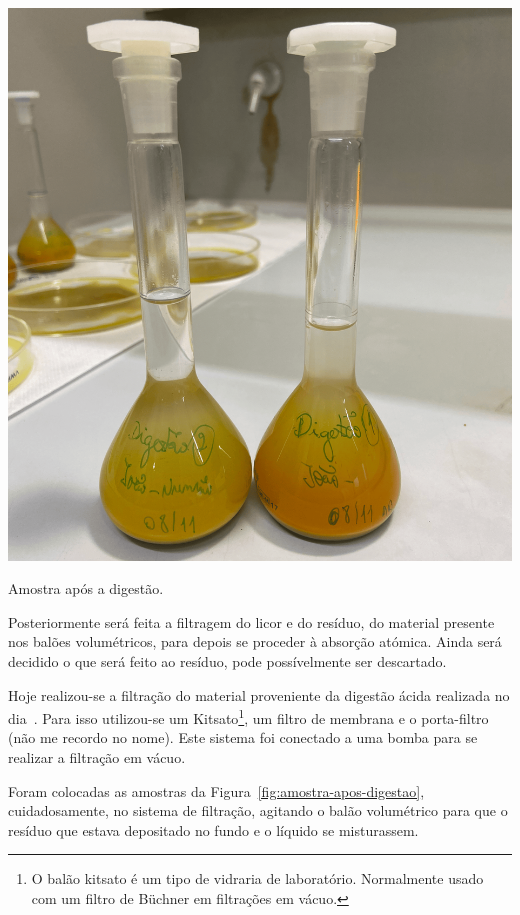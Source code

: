 \begin{marginfigure}[-3\baselineskip]
    \centering
    \includegraphics[width=0.8\linewidth]{figures/Amostra após Digestão}
    \caption{Amostra após a digestão.}
    \label{fig:amostra-apos-digestao}
\end{marginfigure}

Posteriormente será feita a filtragem do licor e do resíduo, do material presente nos balões volumétricos, para depois se proceder à absorção atómica.
Ainda será decidido o que será feito ao resíduo, pode possívelmente ser descartado.

\hrulefill



Hoje realizou-se a filtração do material proveniente da digestão ácida realizada no dia~.
Para isso utilizou-se um Kitsato\footnote{O balão kitsato é um tipo de vidraria de laboratório. Normalmente usado com um filtro de Büchner em filtrações em vácuo.}, um filtro de membrana e o porta-filtro (não me recordo no nome).
Este sistema foi conectado a uma bomba para se realizar a filtração em vácuo.

Foram colocadas as amostras da Figura~\ref{fig:amostra-apos-digestao}, cuidadosamente, no sistema de filtração, agitando o balão volumétrico para que o resíduo que estava depositado no fundo e o líquido se misturassem.

